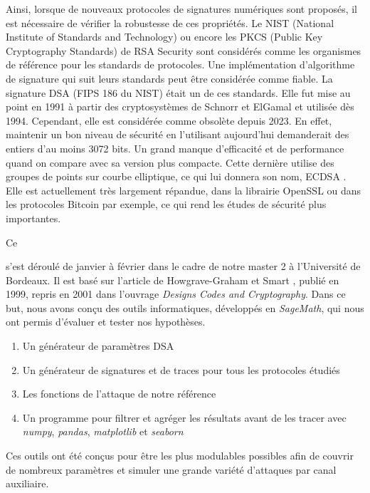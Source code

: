 \documentclass{backend}
\begin{document}
{Ainsi, lorsque de nouveaux protocoles de signatures numériques sont proposés, il est nécessaire de vérifier la robustesse de ces propriétés. Le NIST (National Institute of Standards and Technology) ou encore les PKCS (Public Key Cryptography Standards) de RSA Security sont considérés comme les organismes de référence pour les standards de protocoles. Une implémentation d'algorithme de signature qui suit leurs standards peut être considérée comme fiable.  La signature DSA (FIPS 186 du NIST) était un de ces standards. Elle fut mise au point en 1991 à partir des cryptosystèmes de Schnorr et ElGamal \cite{dsaFIPS} et utilisée dès 1994. Cependant, elle est considérée comme obsolète depuis 2023. En effet, maintenir un bon niveau de sécurité en l'utilisant aujourd'hui demanderait des entiers d'au moins 3072 bits. Un grand manque d'efficacité et de performance quand on compare avec sa version plus compacte. Cette dernière utilise des groupes de points sur courbe elliptique, ce qui lui donnera son nom, ECDSA \cite{ecdsaFIPS}. Elle est actuellement très largement répandue, dans la librairie OpenSSL ou dans les protocoles Bitcoin par exemple, ce qui rend les études de sécurité plus importantes.\medbreak
\newpage
}



Ce \subject\:  s'est déroulé de janvier à février dans le cadre de notre master 2 à l'Université de Bordeaux. Il est basé sur l'article de Howgrave-Graham et Smart \cite{latAtk}, publié en 1999, repris en 2001 dans l'ouvrage \textit{Designs Codes and Cryptography}. Dans ce but, nous avons conçu des outils informatiques, développés en \textit{SageMath}, qui nous ont permis d'évaluer et tester nos hypothèses.

\begin{enumerate}
\item Un générateur de paramètres DSA
\item Un générateur de signatures et de traces pour tous les protocoles étudiés
\item Les fonctions de l'attaque de notre référence
\item Un programme pour filtrer et agréger les résultats avant de les tracer avec \textit{numpy}, \textit{pandas}, \textit{matplotlib} et \textit{seaborn}

\end{enumerate}


Ces outils ont été conçus pour être les plus modulables possibles afin de couvrir de nombreux paramètres et simuler une grande variété d'attaques par canal auxiliaire. \medbreak
\end{document}
